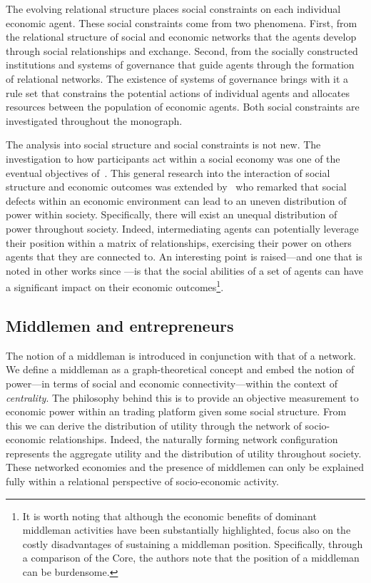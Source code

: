 The evolving relational structure places social constraints on each individual economic agent. These social constraints come from two phenomena. First, from the relational structure of social and economic networks that the agents develop through social relationships and exchange. Second, from the socially constructed institutions and systems of governance that guide agents through the formation of relational networks. The existence of systems of governance brings with it a rule set that constrains the potential actions of individual agents and allocates resources between the population of economic agents. Both social constraints are investigated throughout the monograph.

The analysis into social structure and social constraints is not new. The investigation to how participants act within a social economy was one of the eventual objectives of~\citet{vNM}. This general research into the interaction of social structure and economic outcomes was extended by~\citet{KalaiMiddlemen1978} who remarked that social defects within an economic environment can lead to an uneven distribution of power within society. Specifically, there will exist an unequal distribution of power throughout society. Indeed, intermediating agents can potentially leverage their position within a matrix of relationships, exercising their power on others agents that they are connected to. An interesting point is raised---and one that is noted in other works since \citet{Granovetter2005}---is that the social abilities of a set of agents can have a significant impact on their economic outcomes\footnote{It is worth noting that although the economic benefits of dominant middleman activities have been substantially highlighted, \citet{KalaiMiddlemen1978} focus also on the costly disadvantages of sustaining a middleman position. Specifically, through a comparison of the Core, the authors note that the position of a middleman can be burdensome.}.

\subsection{Middlemen and entrepreneurs}

The notion of a middleman is introduced in conjunction with that of a network. We define a middleman as a graph-theoretical concept and embed the notion of power---in terms of social and economic connectivity---within the context of \emph{centrality}. The philosophy behind this is to provide an objective measurement to economic power within an trading platform given some social structure. From this we can derive the distribution of utility through the network of socio-economic relationships. Indeed, the naturally forming network configuration represents the aggregate utility and the distribution of utility throughout society. These networked economies and the presence of middlemen can only be explained fully within a relational perspective of socio-economic activity.

